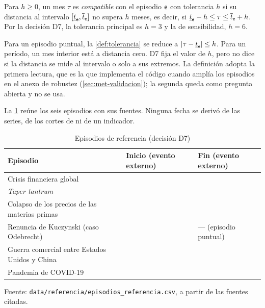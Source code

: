 \begin{definicion}\label{def:tolerancia}
Para $h\ge0$, un mes $\tau$ es \emph{compatible} con el episodio $\mathsf{e}$ con tolerancia $h$ si su
distancia al intervalo $[\underline{t}_{\mathsf{e}},\overline{t}_{\mathsf{e}}]$ no supera $h$ meses, es decir, si
$\underline{t}_{\mathsf{e}}-h\le\tau\le\overline{t}_{\mathsf{e}}+h$. Por la decisión D7, la tolerancia principal es $h=3$ y la de
sensibilidad, $h=6$.
\end{definicion}

\begin{observacion}\label{obs:tolerancia}
Para un episodio puntual, la \cref{def:tolerancia} se reduce a $\lvert \tau-\underline{t}_{\mathsf{e}}\rvert\le h$. Para un
período, un mes interior está a distancia cero. D7 fija el valor de $h$, pero no dice si la
distancia se mide al intervalo o solo a sus extremos. La definición adopta la primera lectura, que
es la que implementa el código cuando amplía los episodios en el anexo de robustez
(\cref{sec:met-validacion}); la segunda queda como pregunta abierta y no se usa.
\end{observacion}

La \cref{tab:episodios} reúne los seis episodios con sus fuentes. Ninguna fecha se derivó de las
series, de los cortes de \textcite{camiz_cerda_atoche_2026} ni de un indicador.

\begin{table}[htbp]
\centering
\small
\caption{Episodios de referencia (decisión D7)}
\label{tab:episodios}
\begin{tabular}{@{}p{}p{}p{}@{}}
\toprule
Episodio & Inicio (evento externo) & Fin (evento externo) \\
\midrule
Crisis financiera global & \episodioCrisisInicio{} \parencite{lehman_brothers_2008} &
  \episodioCrisisFin{} \parencite{nber_2010} \\
\emph{Taper tantrum} & \episodioTaperInicio{} \parencite{bernanke_2013} &
  \episodioTaperFin{} \parencite{reserva_federal_2013} \\
Colapso de los precios de las materias primas & \episodioMateriasInicio{}
  \parencite{stocker_et_al_2015} & \episodioMateriasFin{} \parencite{fmi_2016} \\
Renuncia de Kuczynski (caso Odebrecht) & \episodioKuczynskiInicio{} \parencite{congreso_2018} &
  --- (episodio puntual) \\
Guerra comercial entre Estados Unidos y China & \episodioGuerraInicio{} \parencite{ustr_2018} &
  \episodioGuerraFin{} \parencite{ustr_2020} \\
Pandemia de COVID-19 & \episodioCovidInicio{} \parencite{oms_2020b} &
  \episodioCovidFin{} \parencite{nber_2021} \\
\bottomrule
\end{tabular}

\smallskip
\begin{minipage}{\textwidth}\footnotesize
Fuente: \texttt{data/referencia/episodios\_referencia.csv}, a partir de las fuentes citadas.
\end{minipage}
\end{table}

